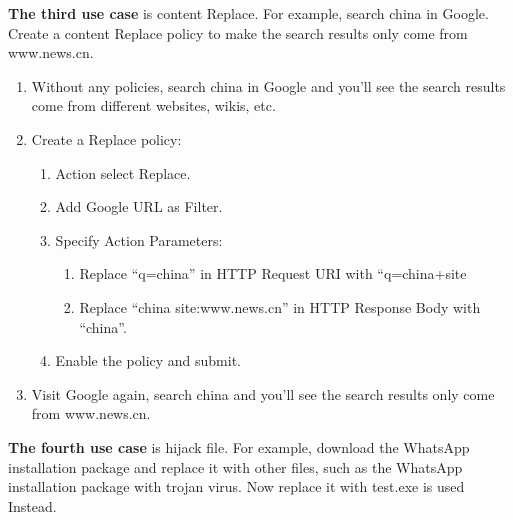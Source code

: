 \textbf{The third use case} is content Replace. For example, search china in Google. Create a content Replace policy to make the search results only come from www.news.cn.

\begin{description}[leftmargin=0pt,itemindent=0em]
    \item[] 
    \begin{enumerate}
        \item	Without any policies, search china in Google and you’ll see the search results come from different websites, wikis, etc.
        \item	Create a Replace policy:
        \begin{enumerate}
            \item	Action select Replace.
            \item	Add Google URL as Filter.
            \item	Specify Action Parameters:
            \begin{enumerate}
                \item	Replace “q=china” in HTTP Request URI with “q=china+site%
                \item	Replace “china site:www.news.cn” in HTTP Response Body with “china”.
            \end{enumerate}	
            \item	Enable the policy and submit. 
        \end{enumerate}	
        \item	Visit Google again, search china and you’ll see the search results only come from www.news.cn.
    \end{enumerate}	
\end{description}

\textbf{The fourth use case} is hijack file. For example, download the WhatsApp installation package and replace it with other files, such as the WhatsApp installation package with trojan virus. Now replace it with test.exe is used Instead.

